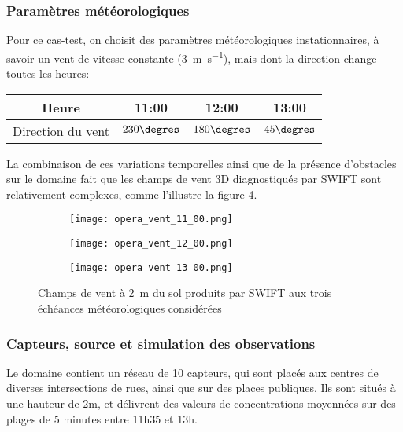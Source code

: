 \subsubsection{Paramètres météorologiques}
Pour ce cas-test, on choisit des paramètres météorologiques instationnaires, à savoir un vent de vitesse constante (\SI{3}{\meter \per \second}), mais dont la direction change toutes les heures:

\begin{center}
	\begin{tabular}{cccc}
		\centering
		Heure & 11:00 &  12:00 &  13:00\\ 
		\hline
		Direction du vent & $230\degres$ & $180\degres$ & $45\degres$
	\end{tabular} 
\end{center}

La combinaison de ces variations temporelles ainsi que de la présence d'obstacles sur le domaine fait que les champs de vent 3D diagnostiqués par SWIFT sont relativement complexes, comme l'illustre la figure \ref{fig_opera_vent}.

\begin{figure}[h!]
	\centering
	\begin{subfigure}[t]{0.5\textwidth}
		\centering
		\texttt{[image: opera\_vent\_11\_00.png]}
		\caption{}
		\label{opera_vent_11_00}
	\end{subfigure}%
	\begin{subfigure}[t]{0.5\textwidth}
		\centering
		\texttt{[image: opera\_vent\_12\_00.png]}
		\caption{}
		\label{opera_vent_12_00}
	\end{subfigure}
	\begin{subfigure}[t]{0.5\textwidth}
		\centering
		\texttt{[image: opera\_vent\_13\_00.png]}
		\caption{}
		\label{opera_vent_13_00}
	\end{subfigure}%
	\caption{Champs de vent à \SI{2}{\meter} du sol produits par SWIFT aux trois échéances météorologiques considérées}
	\label{fig_opera_vent}
	
\end{figure}



\subsubsection{Capteurs, source et simulation des observations}
Le domaine contient un réseau de 10 capteurs, qui sont placés aux centres de diverses intersections de rues, ainsi que sur des places publiques. Ils sont situés à une hauteur de 2m, et délivrent des valeurs de concentrations moyennées sur des plages de 5 minutes entre 11h35 et 13h.


